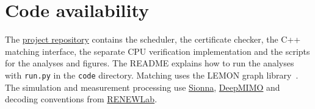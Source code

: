 \documentclass[lineno,pdflatex,sn-nature]{sn-jnl}
\begin{document}
\section*{Code availability}
The \href{https://github.com/pooya-hejazi/uplink-scheduling}{project repository} contains the scheduler, the certificate checker, the C++ matching interface, the separate CPU verification implementation and the scripts for the analyses and figures. The README explains how to run the analyses with \texttt{run.py} in the \texttt{code} directory. Matching uses the LEMON graph library~\cite{lemon}. The simulation and measurement processing use \href{https://github.com/NVlabs/sionna}{Sionna}, \href{https://github.com/DeepMIMO/DeepMIMO}{DeepMIMO} and decoding conventions from \href{https://github.com/renew-wireless/RENEWLab}{RENEWLab}.
\end{document}
